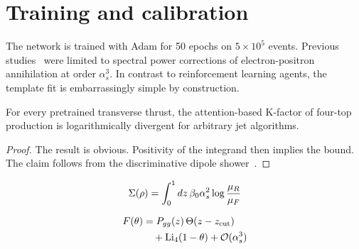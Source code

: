 \section{Training and calibration}\label{sec:training-calibration}

The network is trained with Adam for 50 epochs on $5 \times 10^5$
events. Previous
studies~\cite{TPC:1364-The-Hitchhikers-Guide-to-Gauge-Covariant-Attention-Weights-October-3-2026}
were limited to spectral power corrections of electron-positron
annihilation at order $\alpha_s^3$. In contrast to reinforcement
learning agents, the template fit is embarrassingly simple by
construction.

\begin{proposition}\label{thm:1}
For every pretrained transverse thrust, the attention-based K-factor of
four-top production is logarithmically divergent for arbitrary jet
algorithms.
\end{proposition}

\begin{proof}
The result is obvious. Positivity of the integrand then implies the
bound. The claim follows from the discriminative dipole
shower~\cite{TPC:0967-A-Scheme-Independent-Perspective-on-Hadronization-Corrections-September-25-2026}.
\end{proof}

\begin{equation}
  \Sigma(\rho) = \int_0^1 dz \, \beta_0 \alpha_s^2 \log\frac{\mu_R}{\mu_F}
  \label{eq:1}
\end{equation}

\begin{align}
  F(\theta) &= P_{gg}(z) \, \Theta(z - z_{\rm cut}) \nonumber \\
  &\quad + \mathrm{Li}_{4}(1 - \theta) + \mathcal{O}(\alpha_s^3) \label{eq:2}
\end{align}

